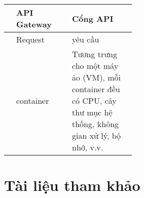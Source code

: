 \documentclass[13pt,a4paper,oneside]{book} %
\begin{document}
\begin{table}[h!]
{\begin{tabular}{|ll|p{0.5\linewidth}|}
		\multicolumn{1}{|l|}{}                  & API Gateway          & Cổng API                              \\ \hline
		\multicolumn{1}{|l|}{}                     & Request                                    & yêu cầu                                       \\ \hline
  		\multicolumn{1}{|l|}{}                     & container                                    & Tương trưng cho một máy ảo (VM), mỗi container đều có CPU, cây thư mục hệ thống, không gian xử lý, bộ nhớ, v.v.                                        \\ \hline
	\end{tabular}
}
\end{table}
\mainmatter

\changefontsizes[16pt]{13pt}
\pagestyle{plain}







\chapter*{Tài liệu tham khảo}
\printbibliography[keyword={vietnam}, heading=subbibliography, title={Tiếng Việt}, resetnumbers=true]
\printbibliography[notkeyword={vietnam}, heading=subbibliography, title=Tiếng Anh]
\end{document}
